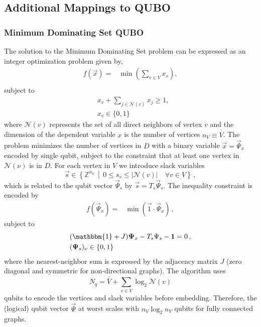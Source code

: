 \documentclass[prd,twocolumn,tightenlines,preprintnumbers,showpacs,superscriptaddress,notitlepage,nofootinbib,eqsecnum,floatfix,longbibliography,aps,10pt]{revtex4-2}
\begin{document}
\subsection{Additional Mappings to QUBO}
\label{sec:methods:ILP-to-QUBO}
\subsubsection{Minimum Dominating Set QUBO}
\label{sec:methods:mds-qubo}

The solution to the Minimum Dominating Set problem can be expressed as an integer optimization problem given by,
\begin{align}
 f(\vec x) = & \min\left(\sum_{v \in V} x_v\right),                    \\
\end{align}
subject to
\begin{align}
 & x_v + \sum_{j \in \mathcal{N}(v)} x_j \geq 1, \\
 & x_v \in \{0, 1\}
\end{align}
where $\mathcal{N}(v)$ represents the set of all direct neighbors of vertex $v$ and the dimension of the dependent variable $x$ is the number of vertices $n_V \equiv \overline{\overline{V}}$.
The problem minimizes the number of vertices in $D$ with a binary variable $\vec x = \vec \Psi_x$ encoded by single qubit, subject to the constraint that at least one vertex in $\mathcal{N}(\nu)$ is in $D$.
For each vertex in $V$ we introduce slack variables
\begin{equation}
    \vec s \in \left\{ \mathbb{Z}^{n_V} \, \middle| \, 0 \leq s_{v} \leq |\mathcal{N}(v)| \quad \forall v\in V \right\} \, ,
\end{equation}
which is related to the qubit vector $\vec \Psi_s$ by $\vec s = T_s \vec \Psi_s$.
The inequality constraint is encoded by
\begin{align}
 f(\vec \Psi_x)
 =
 & \min\left(\vec 1 \cdot \vec \Psi_x \right) \, ,
\end{align}
subject to
\begin{align}
 &
 (\mathbbm{1} + J)\vec \Psi_x - T_s \Psi_s  - \vec 1 = 0\,,
 \\
 &
 (\vec \Psi_s)_\nu \in \{ 0, 1\}
\end{align}
where the nearest-neighbor sum is expressed by the adjacency matrix $J$ (zero diagonal and symmetric for non-directional graphs).
The algorithm uses
\begin{equation}
    N_q = \overline{\overline{V}} + \sum_{v \in V} \log_2 \mathcal{N}(v)
\end{equation}
qubits to encode the vertices and slack variables before embedding.
Therefore, the (logical) qubit vector $\vec \Psi$ at worst scales with $n_V \log_2 n_V$ qubits for fully connected graphs.
\end{document}

